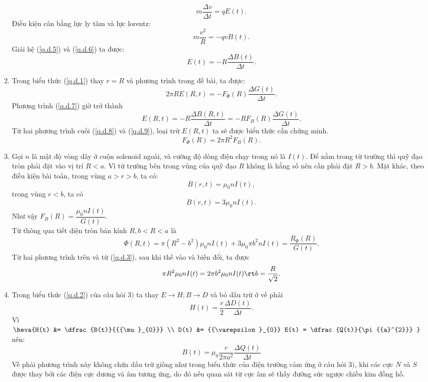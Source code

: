 \begin{loigiai}
\begin{enumerate}[1)]
    \[m\dfrac{\Delta v}{\Delta t} = qE(t).\tag{5}\label{q.d.5}\] 
    Điều kiện cân bằng lực ly tâm và lực lorentz:
    \[m\dfrac{{{v}^{2}}}{R}=-qvB(t)\tag{6}\label{q.d.6}.\]
    Giải hệ (\ref{q.d.5}) và (\ref{q.d.6}) ta được: \[E(t)=-R\dfrac{\Delta B(t)}{\Delta t}. \tag{7}\label{q.d.7}\]
    \item Trong biểu thức (\ref{q.d.1}) thay $r = R$ và phương trình trong đề bài, ta được: 
    \[2\pi R E(R,t) = -{{F}_{\Phi }}(R) \dfrac{\Delta G(t)}{\Delta t}. \tag{8}\label{q.d.8}\]
    Phương trình (\ref{q.d.7}) giờ trở thành
    \[E(R,t) = -R\dfrac{\Delta B(R,t)}{\Delta t} = -R{{F}_{B}}(R)\dfrac{\Delta G(t)}{\Delta t}. \tag{9}\label{q.d.9}\]
    Từ hai phương trình cuối (\ref{q.d.8}) và (\ref{q.d.9}), loại trừ $E(R,t)$ ta sẽ được biểu thức cần chứng minh.
   \[F_{\Phi}(R) = 2 \pi R^{2} F_{B}({R}).\]
   \item Gọi $n$ là mật độ vòng dây ở cuộn solenoid ngoài, và cường độ dòng điện chạy trong nó là $I(t)$. Để nằm trong từ trường thì quỹ đạo tròn phải đặt vào vị trí $R<a$. Vì từ trường bên trong vùng của quỹ đạo $R$ không là hằng số nên cần phải đặt $R>b$. Mặt khác, theo điều kiện bài toán, trong vùng $a>r>b$, ta có: \[B(r,t)={{\mu }_{0}}nI(t),\] trong vùng $r<b$, ta có \[B(r,t)=3{{\mu }_{0}}nI(t).\] Như vậy $F_B(R) = \dfrac{{{\mu }_{0}}nI(t)}{G(t)}$.\\  
    Từ thông qua tiết diện tròn bán kính $R, b<R<a$ là
    \[\Phi(R,t) = \pi ({{R}^{2}}-{{b}^{2}}){{\mu }_{0}}nI(t)+3{{\mu }_{0}}\pi{{b}^{2}}nI(t) = \dfrac{R_\Phi(R)}{G(t)}.\] 
    Từ hai phương trình trên và từ (\ref{q.d.3}), sau khi thế vào và biến đổi, ta được
    \[\pi {{R}^{2}}{{\mu }_{0}}nI(t) =  2\pi {{b}^{2}}{{\mu }_{0}}nI(t) \rt b = \dfrac{R}{\sqrt{2}}.\]
    \item Trong biểu thức (\ref{q.d.2}) của câu hỏi $3)$ ta thay $E\to H; B\to D$  và bỏ dấu trừ ở vế phải
    \[H(t)=\dfrac{r}{2}\dfrac{\Delta D(t)}{\Delta t}.\] 
    Vì $\heva{H(t) &= \dfrac{B(t)}{{{\mu }_{0}}} \\ D(t) &= {{\varepsilon }_{0}} E(t) = \dfrac{Q(t)}{\pi {{a}^{2}}} }$  nên:
    \[B(t)={{\mu }_{0}}\frac{r}{2\pi {{a}^{2}}}\dfrac{\Delta Q(t)}{\Delta t}\]  
    Vế phải phương trình này không chứa dấu trừ giống như trong biểu thức của điện trường cảm ứng ở câu hỏi $3)$, khi các cực $N$ và $S$ được thay bởi các điện cực dương và âm tương ứng, do đó nếu quan sát từ cực âm sẽ thấy đường sức ngược chiều kim đồng hồ.
\end{enumerate}
\end{loigiai}
